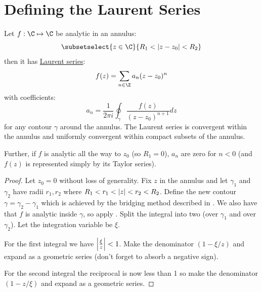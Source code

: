 \documentclass[../Main.tex]{subfiles}
\begin{document}
\section{Defining the Laurent Series}
\begin{proposition}
    Let $f : \C \mapsto \C$ be analytic in an annulus:
    \begin{equation*}
        \subsetselect{z \in \C}{R_1 < \abs{z - z_0} < R_2}
    \end{equation*}
    then it has \underline{Laurent series}:
    \begin{equation*}
        f(z) = \sum_{n \in \Z} a_n (z - z_0)^n
    \end{equation*}
    with coefficients:
    \begin{equation*}
        a_n = \frac{1}{2\pi i} \oint_\gamma \frac{f(z)}{(z - z_0)^{n+1}} dz
    \end{equation*}
    for any contour $\gamma$ around the annulus. The Laurent series is convergent within the annulus and uniformly convergent within compact subsets of the annulus.

    Further, if $f$ is analytic all the way to $z_0$ (so $R_1 = 0$), $a_n$ are zero for $n < 0$ (and $f(z)$ is represented simply by its Taylor series).
    \label{propLaurent}
\end{proposition}
\begin{proof}
    Let $z_0 = 0$ without loss of generality. Fix $z$ in the annulus and let $\gamma_1$ and $\gamma_2$ have radii $r_1, r_2$ where $R_1 < r_1 < \left|z\right| < r_2 < R_2$. Define the new contour $\gamma = \gamma_2 - \gamma_1$ which is achieved by the bridging method described in . We also have that $f$ is analytic inside $\gamma$, so apply . Split the integral into two (over $\gamma_1$ and over $\gamma_2$). Let the integration variable be $\xi$.

    For the first integral we have $\left|\frac{\xi}{z}\right| < 1$. Make the denominator $(1 - \xi / z)$ and expand as a geometric series (don't forget to absorb a negative sign).
    
    For the second integral the reciprocal is now less than 1 so make the denominator $(1 - z / \xi)$ and expand as a geometric series. 
\end{proof}
\end{document}
